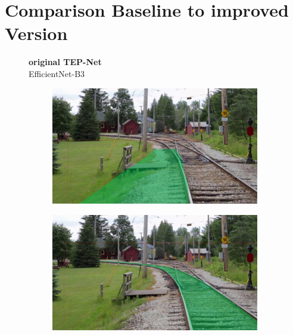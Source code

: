 \section{Comparison Baseline to improved Version}

\begin{figure}[H]
    \centering
    \begin{minipage}{0.2\textwidth} %
        \centering
        \textbf{original TEP-Net}\\
        EfficientNet-B3
    \end{minipage}%
    \hfill
    \begin{minipage}{0.6\textwidth} %
        \centering
        \begin{subfigure}[b]{0.48\textwidth}
            \centering
            \includegraphics[width=\textwidth]{PICs/experiments/ComparisonBaselineToImproved/original2.jpg}
        \end{subfigure}
        \begin{subfigure}[b]{0.48\textwidth}
            \centering
            \includegraphics[width=\textwidth]{PICs/experiments/ComparisonBaselineToImproved/adapted2.jpg}
        \end{subfigure}
        

\end{minipage}
\end{figure}
